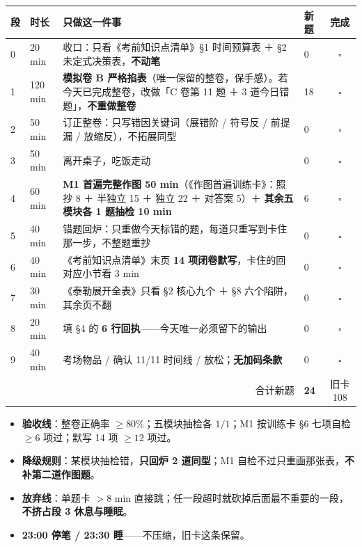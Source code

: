 \documentclass[11pt,a4paper]{ctexart}
\begin{document}
\begin{center}\footnotesize
\begin{tabular}{@{}p{1.0cm}p{1.5cm}p{9.0cm}p{1.2cm}c@{}}
\toprule
\textbf{段} & \textbf{时长} & \textbf{只做这一件事} & \textbf{新题} & \textbf{完成} \\
\midrule
0 & 20 min & 收口：只看《考前知识点清单》§1 时间预算表 ＋ §2 未定式决策表，\textbf{不动笔} & 0 & $\square$ \\
1 & 120 min & \textbf{模拟卷 B 严格掐表}（唯一保留的整卷，保手感）。若今天已完成整卷，改做「C 卷第 11 题 ＋ 3 道今日错题」，\textbf{不重做整卷} & 18 & $\square$ \\
2 & 50 min & 订正整卷：只写错因关键词（展错阶 / 符号反 / 前提漏 / 放缩反），不拓展同型 & 0 & $\square$ \\
3 & 50 min & 离开桌子，吃饭走动 & 0 & $\square$ \\
4 & 60 min & \textbf{M1 首遍完整作图 50 min}（《作图首遍训练卡》：照抄 8 ＋ 半独立 15 ＋ 独立 22 ＋ 对答案 5）＋ \textbf{其余五模块各 1 题抽检 10 min} & 6 & $\square$ \\
5 & 40 min & 错题回炉：只重做今天标错的题，每道只重写到卡住那一步，不整题重抄 & 0 & $\square$ \\
6 & 40 min & 《考前知识点清单》末页 \textbf{14 项闭卷默写}，卡住的回对应小节看 3 min & 0 & $\square$ \\
7 & 30 min & 《泰勒展开全表》只看 §2 核心九个 ＋ §8 六个陷阱，其余页不翻 & 0 & $\square$ \\
8 & 20 min & 填 §4 的 \textbf{6 行回执}——今天唯一必须留下的输出 & 0 & $\square$ \\
9 & 40 min & 考场物品 / 确认 11/11 时间线 / 放松；\textbf{无加码条款} & 0 & $\square$ \\
\midrule
\multicolumn{3}{r}{合计新题} & \textbf{24} & 旧卡 108 \\
\bottomrule
\end{tabular}
\end{center}

\begin{keypoint}[验收线与放弃线]
\begin{itemize}\itemsep=1pt
\item \textbf{验收线}：整卷正确率 $\ge 80\%$；五模块抽检各 $1/1$；M1 按训练卡 §6 七项自检 $\ge 6$ 项过；默写 14 项 $\ge 12$ 项过。
\item \textbf{降级规则}：某模块抽检错，\textbf{只回炉 2 道同型}；M1 自检不过只重画那张表，\textbf{不补第二道作图题}。
\item \textbf{放弃线}：单题卡 $>8$ min 直接跳；任一段超时就砍掉后面最不重要的一段，\textbf{不挤占段 3 休息与睡眠}。
\item \textbf{23:00 停笔 / 23:30 睡}——不压缩，旧卡这条保留。
\end{itemize}
\end{keypoint}
\end{document}
